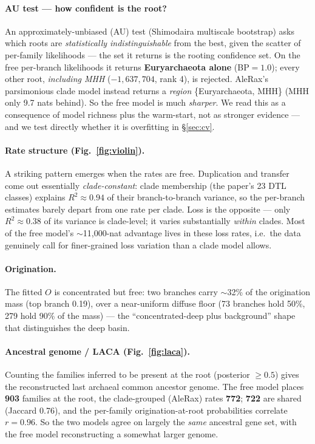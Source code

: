 \documentclass[11pt]{article}
\begin{document}
\paragraph{AU test --- how confident is the root?} An approximately-unbiased (AU) test
(Shimodaira multiscale bootstrap) asks which roots are \emph{statistically indistinguishable}
from the best, given the scatter of per-family likelihoods --- the set it returns is the
rooting confidence set. On the free per-branch likelihoods it returns
\textbf{Euryarchaeota alone} (BP$=1.0$); every other root, \emph{including MHH}
($-1{,}637{,}704$, rank 4), is rejected. AleRax's parsimonious clade model instead returns a
\emph{region} \{Euryarchaeota, MHH\} (MHH only 9.7 nats behind). So the free model is much
\emph{sharper}. We read this as a consequence of model richness plus the warm-start, not as
stronger evidence --- and we test directly whether it is overfitting in \S\ref{sec:cv}.

\paragraph{Rate structure (Fig.~\ref{fig:violin}).} A striking pattern emerges when the
rates are free. Duplication and transfer come out essentially \emph{clade-constant}: clade
membership (the paper's 23 DTL classes) explains $R^2\approx0.94$ of their branch-to-branch
variance, so the per-branch estimates barely depart from one rate per clade. Loss is the
opposite --- only $R^2\approx0.38$ of its variance is clade-level; it varies substantially
\emph{within} clades. Most of the free model's $\sim$11{,}000-nat advantage lives in these
loss rates, i.e.\ the data genuinely call for finer-grained loss variation than a clade model
allows.

\paragraph{Origination.} The fitted $O$ is concentrated but free: two branches carry
$\sim$32\% of the origination mass (top branch 0.19), over a near-uniform diffuse floor
(73 branches hold 50\%, 279 hold 90\% of the mass) --- the ``concentrated-deep plus
background'' shape that distinguishes the deep basin.

\paragraph{Ancestral genome / LACA (Fig.~\ref{fig:laca}).} Counting the families inferred to
be present at the root (posterior $\ge0.5$) gives the reconstructed last archaeal common
ancestor genome. The free model places \textbf{903} families at the root, the clade-grouped
(AleRax) rates \textbf{772}; \textbf{722} are shared (Jaccard 0.76), and the per-family
origination-at-root probabilities correlate $r=0.96$. So the two models agree on largely the
\emph{same} ancestral gene set, with the free model reconstructing a somewhat larger genome.
\end{document}
